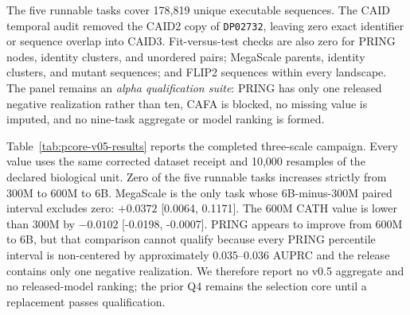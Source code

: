 \documentclass{article}
\newcommand{\code}[1]{\texttt{#1}}
\begin{document}
The five runnable tasks cover 178,819 unique executable sequences. The CAID
temporal audit removed the CAID2 copy of \code{DP02732}, leaving zero exact
identifier or sequence overlap into CAID3. Fit-versus-test checks are also zero
for PRING nodes, identity clusters, and unordered pairs; MegaScale parents,
identity clusters, and mutant sequences; and FLIP2 sequences within every
landscape. The panel remains an \emph{alpha qualification suite}: PRING has
only one released negative realization rather than ten, CAFA is blocked, no
missing value is imputed, and no nine-task aggregate or model ranking is
formed.

Table~\ref{tab:pcore-v05-results} reports the completed three-scale campaign.
Every value uses the same corrected dataset receipt and 10,000 resamples of the
declared biological unit. Zero of the five runnable tasks increases strictly
from 300M to 600M to 6B. MegaScale is the only task whose 6B-minus-300M paired
interval excludes zero: $+0.0372$ [0.0064, 0.1171]. The 600M CATH value is
lower than 300M by $-0.0102$ [-0.0198, -0.0007]. PRING appears to improve from
600M to 6B, but that comparison cannot qualify because every PRING percentile
interval is non-centered by approximately 0.035--0.036 AUPRC and the release
contains only one negative realization. We therefore report no v0.5 aggregate
and no released-model ranking; the prior Q4 remains the selection core until a
replacement passes qualification.
\end{document}
